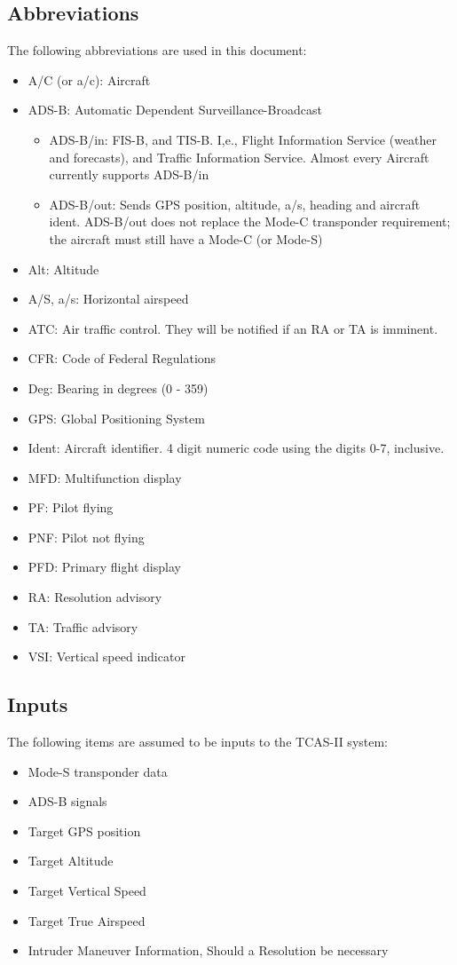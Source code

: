 \documentclass[conference]{IEEEtran}
\begin{document}
\subsection{Abbreviations}
The following abbreviations are used in this document:
\begin{itemize}
\item A/C (or a/c): Aircraft
\item ADS-B: Automatic Dependent Surveillance-Broadcast
\begin{itemize}
    \item ADS-B/in: FIS-B, and TIS-B. I,e., Flight Information Service (weather and forecasts), and Traffic Information Service. Almost every Aircraft currently supports ADS-B/in
    \item ADS-B/out: Sends GPS position, altitude, a/s, heading and aircraft ident. ADS-B/out does not replace the Mode-C transponder requirement; the aircraft must still have a Mode-C (or Mode-S)
\end{itemize}
\item Alt: Altitude
\item A/S, a/s: Horizontal airspeed
\item ATC: Air traffic control. They will be notified if an RA or TA is imminent. \cite{5} \cite{6} \cite{7}
\item CFR: Code of Federal Regulations
\item Deg: Bearing in degrees (0 - 359)
\item GPS: Global Positioning System
\item Ident: Aircraft identifier. 4 digit numeric code using the digits 0-7, inclusive.
\item MFD: Multifunction display
\item PF: Pilot flying
\item PNF: Pilot not flying
\item PFD: Primary flight display
\item RA: Resolution advisory
\item TA: Traffic advisory
\item VSI: Vertical speed indicator
\end{itemize}

\subsection{Inputs}
The following items are assumed to be inputs to the TCAS-II system:
\begin{itemize}
\item Mode-S transponder data
\item ADS-B signals
\item Target GPS position
\item Target Altitude
\item Target Vertical Speed
\item Target True Airspeed
\item Intruder Maneuver Information, Should a Resolution be necessary
\end{itemize}
\end{document}
